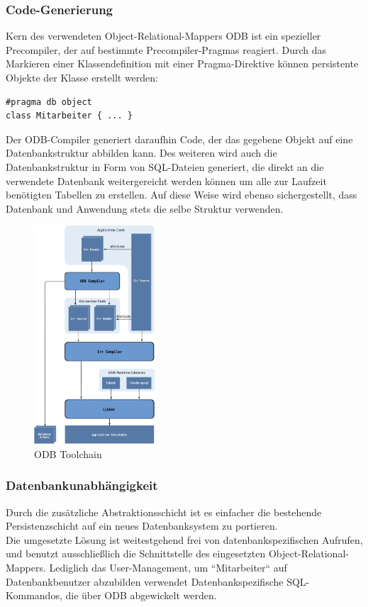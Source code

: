 \newpage

\subsubsection{Code-Generierung}
Kern des verwendeten Object-Relational-Mappers ODB ist ein spezieller Precompiler, der auf bestimmte Precompiler-Pragmas reagiert.
Durch das Markieren einer Klassendefinition mit einer Pragma-Direktive können persistente Objekte der Klasse erstellt werden:\\
\begin{lstlisting}
#pragma db object
class Mitarbeiter { ... }
\end{lstlisting}
Der ODB-Compiler generiert daraufhin Code, der das gegebene Objekt auf eine Datenbankstruktur abbilden kann. Des weiteren wird auch die Datenbankstruktur in Form von SQL-Dateien generiert, die direkt an die verwendete Datenbank weitergereicht werden können um alle zur Laufzeit benötigten Tabellen zu erstellen. Auf diese Weise wird ebenso sichergestellt, dass Datenbank und Anwendung stets die selbe Struktur verwenden.\\
\begin{figure}[htp!]
	\begin{center}
		\includegraphics[width=0.4\textwidth]{odb-flow}
	\end{center}
	\caption{ODB Toolchain \cite{ODB_Manual}}
	\label{ODB-Flow}
\end{figure}

\newpage

\subsubsection{Datenbankunabhängigkeit}
Durch die zusätzliche Abstraktionsschicht ist es einfacher die bestehende Persistenzschicht auf ein neues Datenbanksystem zu portieren.\\
Die umgesetzte Lösung ist weitestgehend frei von datenbankspezifischen Aufrufen, und benutzt ausschließlich die Schnittstelle des eingesetzten Object-Relational-Mappers.
Lediglich das User-Management, um ``Mitarbeiter`` auf Datenbankbenutzer abzubilden verwendet Datenbankspezifische SQL-Kommandos, die über ODB abgewickelt werden.

